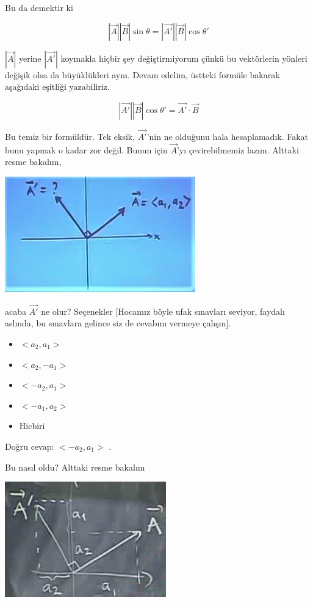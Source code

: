 \documentclass[12pt,fleqn]{article}\usepackage{../../common}
\begin{document}
Bu da demektir ki 

$$ |\vec{A}||\vec{B}|\sin\theta = |\vec{A'}||\vec{B}|\cos\theta'  $$

$|\vec{A}|$ yerine $|\vec{A'}|$ koymakla hiçbir şey değiştirmiyorum çünkü bu
vektörlerin yönleri değişik olsa da büyüklükleri aynı. Devam edelim, üstteki
formüle bakarak aşağıdaki eşitliği yazabiliriz.

$$ |\vec{A'}||\vec{B}|\cos\theta' = \vec{A'} \cdot \vec{B} $$

Bu temiz bir formüldür. Tek eksik, $\vec{A'}$'nin ne olduğunu hala
hesaplamadık. Fakat bunu yapmak o kadar zor değil. Bunun için $\vec{A}$'yı
çevirebilmemiz lazım. Alttaki resme bakalım,

\includegraphics[height=5cm]{2_7.png}

acaba $\vec{A'}$ ne olur?  Seçenekler [Hocamız böyle ufak sınavları seviyor,
faydalı aslında, bu sınavlara gelince siz de cevabını vermeye çalışın].

\begin{itemize}
   \item $< a_2,a_1 >$
   \item $< a_2,-a_1 >$
   \item $< -a_2,a_1 >$
   \item $< -a_1,a_2 >$
   \item Hicbiri
\end{itemize}
Doğru cevap: $< -a_2,a_1 >$ . 

Bu nasıl oldu? Alttaki resme bakalım

\includegraphics[height=5cm]{2_8.png}
\end{document}
